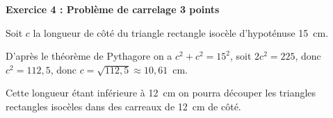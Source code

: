 \textbf{Exercice 4 : Problème de carrelage \hfill 3 points}

\medskip

%
%
%
Soit $c$ la longueur de côté du triangle rectangle isocèle d’hypoténuse 15~cm.

D’après le théorème de Pythagore on a $c^2 + c^2 = 15^2$, soit $2c^2 = 225$, donc $c^2 = 112,5$, donc $c = \sqrt{112,5} \approx 10,61$~cm.

Cette longueur étant inférieure à 12~cm on pourra découper les triangles rectangles isocèles dans des carreaux de 12~cm de côté.
\vspace{0,5cm}

